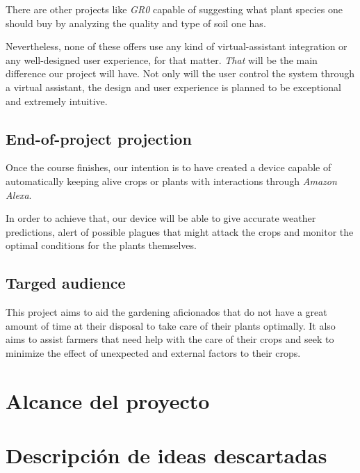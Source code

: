 \documentclass[runningheads]{llncs}
\begin{document}
    There are other projects like \textit{GR0} capable of suggesting what plant
    species one should buy by analyzing the quality and type of soil one has.

    \newline
    
    Nevertheless, none of these offers use any kind of virtual-assistant
    integration or any well-designed user experience, for that
    matter. \textit{That} will be the main difference our project will have. Not
    only will the user control the system through a virtual assistant, 
    the design and user experience is planned to be exceptional and extremely 
    intuitive.

   
    \subsection{End-of-project projection}
   
    Once the course finishes, our intention is to have created a device capable
    of automatically keeping alive crops or plants with interactions through
    \textit{Amazon Alexa}.

    In order to achieve that, our device will be able to give accurate weather
    predictions, alert of possible plagues that might attack the crops and
    monitor the optimal conditions for the plants themselves.
    

    \subsection{Targed audience}
    
    This project aims to aid the gardening aficionados that do not have a great
    amount of time at their disposal to take care of their plants optimally. It
    also aims to assist farmers that need help with the care of their crops and
    seek to minimize the effect of unexpected and external factors to their
    crops.

\section{Alcance del proyecto}

\section{Descripción de ideas descartadas}
\end{document}
